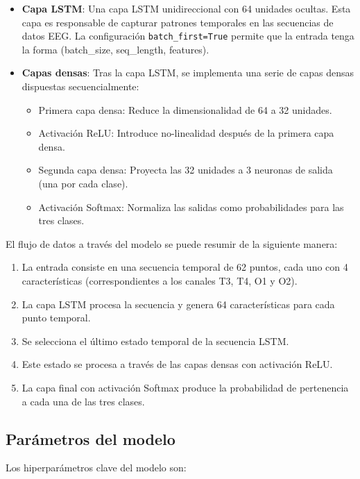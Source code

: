 \begin{itemize}
    \item \textbf{Capa LSTM}: Una capa LSTM unidireccional con 64 unidades ocultas. Esta capa es responsable de capturar patrones temporales en las secuencias de datos EEG. La configuración \texttt{batch\_first=True} permite que la entrada tenga la forma (batch\_size, seq\_length, features).
    
    \item \textbf{Capas densas}: Tras la capa LSTM, se implementa una serie de capas densas dispuestas secuencialmente:
    \begin{itemize}
        \item Primera capa densa: Reduce la dimensionalidad de 64 a 32 unidades.
        \item Activación ReLU: Introduce no-linealidad después de la primera capa densa.
        \item Segunda capa densa: Proyecta las 32 unidades a 3 neuronas de salida (una por cada clase).
        \item Activación Softmax: Normaliza las salidas como probabilidades para las tres clases.
    \end{itemize}
\end{itemize}

El flujo de datos a través del modelo se puede resumir de la siguiente manera:

\begin{enumerate}
    \item La entrada consiste en una secuencia temporal de 62 puntos, cada uno con 4 características (correspondientes a los canales T3, T4, O1 y O2).
    \item La capa LSTM procesa la secuencia y genera 64 características para cada punto temporal.
    \item Se selecciona el último estado temporal de la secuencia LSTM.
    \item Este estado se procesa a través de las capas densas con activación ReLU.
    \item La capa final con activación Softmax produce la probabilidad de pertenencia a cada una de las tres clases.
\end{enumerate}

\subsection{Parámetros del modelo}

Los hiperparámetros clave del modelo son:

